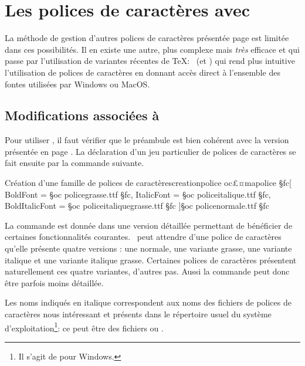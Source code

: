
\chapter{Les polices de caractères avec \XeLaTeXtitre}
 \label{fontes} \label{xelatex}

La méthode de gestion d'autres polices de caractères présentée page \pageref{carac} est limitée dans ces possibilités. Il en existe une autre, plus complexe mais \emph{très} efficace et qui passe par l'utilisation de variantes récentes de \TeX : \XeTeX\ (et \XeLaTeX) qui rend plus intuitive l'utilisation de polices de caractères en donnant accès direct à l'ensemble des fontes utilisées par Windows ou MacOS.

\section{Modifications associées à \XeLaTeXtitre}

Pour utiliser \XeLaTeX, il faut vérifier que le préambule est bien cohérent avec la version présentée en page \pageref{xelualatex}. La déclaration d'un jeu particulier de polices de caractères se fait ensuite par la commande suivante.

\begin{codesimple}{Création d'une famille de polices de caractères}{creationpolice}
\newfontfamily\§oc£¤mapolice §fc[
 BoldFont = §oc policegrasse.ttf §fc,
 ItalicFont = §oc policeitalique.ttf §fc,
 BoldItalicFont = §oc policeitaliquegrasse.ttf §fc
 ]{§oc policenormale.ttf §fc}
\end{codesimple}

La commande est donnée dans une version détaillée permettant de bénéficier de certaines fonctionnalités courantes. \XeLaTeX\ peut attendre d'une police de caractères qu'elle présente quatre versions : une normale, une variante grasse, une variante italique et une variante italique grasse. Certaines polices de caractères présentent naturellement ces quatre variantes, d'autres pas. Aussi la commande peut donc être parfois moins détaillée. 

Les noms indiqués en italique correspondent aux noms des fichiers de polices de caractères nous intéressant et présents dans le répertoire usuel du système d'exploitation\footnote{Il s'agit de  pour Windows.}: ce peut être des fichiers  ou .

